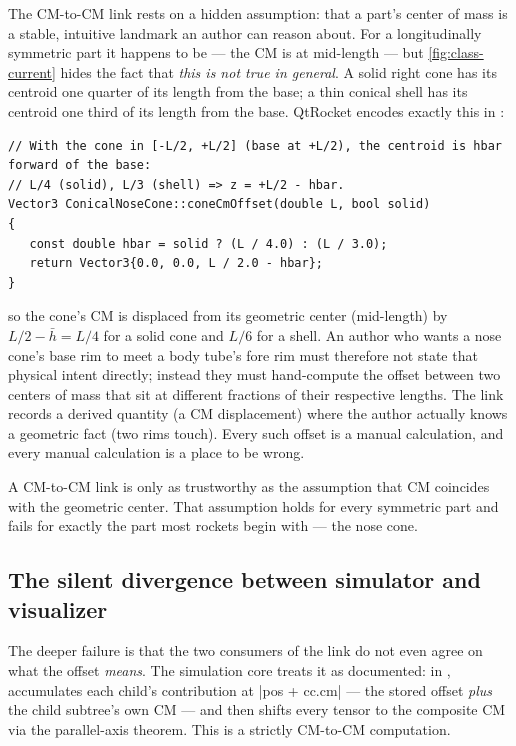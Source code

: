 The CM-to-CM link rests on a hidden assumption: that a part's center of mass is a stable, intuitive
landmark an author can reason about. For a longitudinally symmetric part it happens to be ---
the CM is at mid-length --- but \cref{fig:class-current} hides the fact that \emph{this is not true
in general}. A solid right cone has its centroid one quarter of its length from the base; a thin
conical shell has its centroid one third of its length from the base. QtRocket encodes exactly this
in :

\begin{verbatim}
// With the cone in [-L/2, +L/2] (base at +L/2), the centroid is hbar forward of the base:
// L/4 (solid), L/3 (shell) => z = +L/2 - hbar.
Vector3 ConicalNoseCone::coneCmOffset(double L, bool solid)
{
   const double hbar = solid ? (L / 4.0) : (L / 3.0);
   return Vector3{0.0, 0.0, L / 2.0 - hbar};
}
\end{verbatim}

\noindent so the cone's CM is displaced from its geometric center (mid-length) by $L/2 - \bar{h} =
L/4$ for a solid cone and $L/6$ for a shell. An author who wants a nose cone's base rim to meet a
body tube's fore rim must therefore not state that physical intent directly; instead they must
hand-compute the offset between two centers of mass that sit at different fractions of their
respective lengths. The link records a derived quantity (a CM displacement) where the author
actually knows a geometric fact (two rims touch). Every such offset is a manual calculation, and
every manual calculation is a place to be wrong.

\begin{keyinsight}
A CM-to-CM link is only as trustworthy as the assumption that CM coincides with the geometric
center. That assumption holds for every symmetric part and fails for exactly the part most rockets
begin with --- the nose cone.
\end{keyinsight}

\subsection{The silent divergence between simulator and visualizer}

The deeper failure is that the two consumers of the link do not even agree on what the offset
\emph{means}. The simulation core treats it as documented: in ,
 accumulates each child's contribution at \cppinline|pos + cc.cm| ---
the stored offset \emph{plus} the child subtree's own CM --- and then shifts every tensor to the
composite CM via the parallel-axis theorem. This is a strictly CM-to-CM computation.

